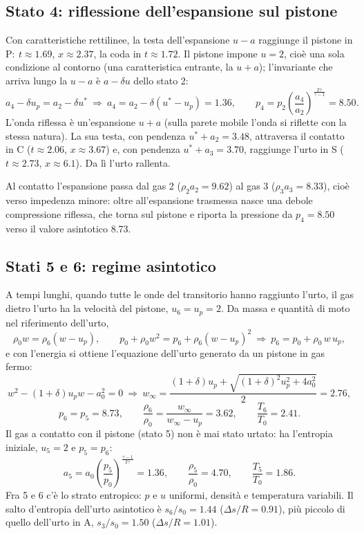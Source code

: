 \documentclass[11pt,a4paper]{article}
\newcommand{\uma}{u-a}
\newcommand{\upa}{u+a}
\begin{document}
\subsection*{Stato 4: riflessione dell'espansione sul pistone}
Con caratteristiche rettilinee, la testa dell'espansione $\uma$ raggiunge il pistone in
$\text{P}:\ t\approx\num{1.69}$, $x\approx\num{2.37}$, la coda in $t\approx\num{1.72}$. Il pistone impone $u=2$,
cioè una sola condizione al contorno (una caratteristica entrante, la $\upa$); l'invariante che arriva lungo la
$\uma$ è $a-\delta u$ dello stato 2:
\[
a_4-\delta u_p=a_2-\delta u^*\ \Rightarrow\ a_4=a_2-\delta(u^*-u_p)=\num{1.36},\qquad
p_4=p_2\left(\frac{a_4}{a_2}\right)^{\frac{2\gamma}{\gamma-1}}=\num{8.50}.
\]
L'onda riflessa è un'espansione $\upa$ (sulla parete mobile l'onda si riflette con la stessa natura). La sua
testa, con pendenza $u^*+a_2=\num{3.48}$, attraversa il contatto in C ($t\approx\num{2.06}$, $x\approx\num{3.67}$)
e, con pendenza $u^*+a_3=\num{3.70}$, raggiunge l'urto in S ($t\approx\num{2.73}$, $x\approx\num{6.1}$). Da lì
l'urto rallenta.

Al contatto l'espansione passa dal gas 2 ($\rho_2a_2=\num{9.62}$) al gas 3 ($\rho_3a_3=\num{8.33}$), cioè verso
impedenza minore: oltre all'espansione trasmessa nasce una debole compressione riflessa, che torna sul pistone e
riporta la pressione da $p_4=\num{8.50}$ verso il valore asintotico \num{8.73}.

\subsection*{Stati 5 e 6: regime asintotico}
A tempi lunghi, quando tutte le onde del transitorio hanno raggiunto l'urto, il gas dietro l'urto ha la velocità del
pistone, $u_6=u_p=2$. Da massa e quantità di moto nel riferimento dell'urto,
\[
\rho_0w=\rho_6(w-u_p),\qquad p_0+\rho_0w^2=p_6+\rho_6(w-u_p)^2
\ \Rightarrow\ p_6=p_0+\rho_0\,w\,u_p,
\]
e con l'energia si ottiene l'equazione dell'urto generato da un pistone in gas fermo:
\[
w^2-(1+\delta)u_pw-a_0^2=0\ \Rightarrow\
w_\infty=\frac{(1+\delta)u_p+\sqrt{(1+\delta)^2u_p^2+4a_0^2}}{2}=\num{2.76},
\]
\[
p_6=p_5=\num{8.73},\qquad \frac{\rho_6}{\rho_0}=\frac{w_\infty}{w_\infty-u_p}=\num{3.62},\qquad
\frac{T_6}{T_0}=\num{2.41}.
\]
Il gas a contatto con il pistone (stato 5) non è mai stato urtato: ha l'entropia iniziale, $u_5=2$ e $p_5=p_6$:
\[
a_5=a_0\left(\frac{p_5}{p_0}\right)^{\frac{\gamma-1}{2\gamma}}=\num{1.36},\qquad
\frac{\rho_5}{\rho_0}=\num{4.70},\qquad \frac{T_5}{T_0}=\num{1.86}.
\]
Fra 5 e 6 c'è lo strato entropico: $p$ e $u$ uniformi, densità e temperatura variabili. Il salto d'entropia
dell'urto asintotico è $s_6/s_0=\num{1.44}$ ($\Delta s/R=\num{0.91}$), più piccolo di quello dell'urto in A,
$s_3/s_0=\num{1.50}$ ($\Delta s/R=\num{1.01}$).
\end{document}
